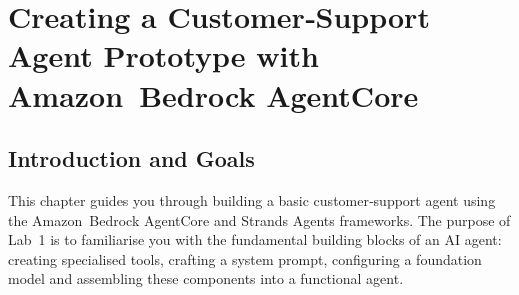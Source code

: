 



% 



\chapter{Creating a Customer‑Support Agent Prototype with Amazon Bedrock AgentCore}
\label{chap:Creating a Customer‑Support Agent Prototype with Amazon Bedrock AgentCore}
\section{Introduction and Goals}

This chapter guides you through building a basic customer‑support agent using
the Amazon Bedrock AgentCore and Strands Agents frameworks.  The purpose of
Lab 1 is to familiarise you with the fundamental building blocks of an AI
agent: creating specialised tools, crafting a system prompt, configuring a
foundation model and assembling these components into a functional agent.

